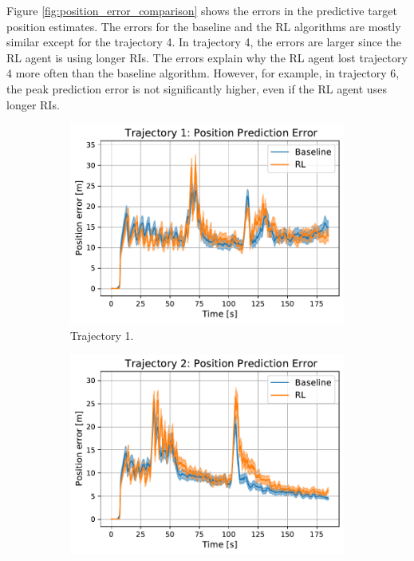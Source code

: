 \documentclass[english, 12pt, a4paper, elec, utf8, a-1b, online]{aaltothesis}
\numberwithin{equation}{section}
\begin{document}
Figure \ref{fig:position_error_comparison} shows the errors in the predictive target position estimates.
The errors for the baseline and the RL algorithms are mostly similar except for the trajectory 4.
In trajectory 4, the errors are larger since the RL agent is using longer RIs.
The errors explain why the RL agent lost trajectory 4 more often than the baseline algorithm.
However, for example, in trajectory 6, the peak prediction error is not significantly higher, even if the RL agent uses longer RIs.

\begin{figure}
    \centering
    \begin{subfigure}[b]{0.45\textwidth}
        \centering
        \includegraphics[width=\linewidth]{figures/benchmark/Simulations/mean_position_error0.pdf}
        \caption{Trajectory 1.}
        \label{fig:PE_T1}
    \end{subfigure}
    \hfill
    \begin{subfigure}[b]{0.45\textwidth}
        \centering
        \includegraphics[width=\linewidth]{figures/benchmark/Simulations/mean_position_error1.pdf}

\end{subfigure}
\end{figure}
\end{document}
